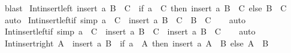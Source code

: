 \begin{isabellebody}
%
\isatagproof
{}\isamarkupfalse%
\ blast%
\endisatagproof
{\isafoldproof}%
%
\isadelimproof
\isanewline
%
\endisadelimproof
\isanewline
{}\isamarkupfalse%
\ Int{\isacharunderscore}{\kern0pt}insert{\isacharunderscore}{\kern0pt}left{\isacharcolon}{\kern0pt}\ {\isachardoublequoteopen}{\isacharparenleft}{\kern0pt}insert\ a\ B{\isacharparenright}{\kern0pt}\ {\isasyminter}\ C\ {\isacharequal}{\kern0pt}\ {\isacharparenleft}{\kern0pt}if\ a\ {\isasymin}\ C\ then\ insert\ a\ {\isacharparenleft}{\kern0pt}B\ {\isasyminter}\ C{\isacharparenright}{\kern0pt}\ else\ B\ {\isasyminter}\ C{\isacharparenright}{\kern0pt}{\isachardoublequoteclose}\isanewline
%
\isadelimproof
\ \ %
\endisadelimproof
%
\isatagproof
{}\isamarkupfalse%
\ auto%
\endisatagproof
{\isafoldproof}%
%
\isadelimproof
\isanewline
%
\endisadelimproof
\isanewline
{}\isamarkupfalse%
\ Int{\isacharunderscore}{\kern0pt}insert{\isacharunderscore}{\kern0pt}left{\isacharunderscore}{\kern0pt}if{}\ {\isacharbrackleft}{\kern0pt}simp{\isacharbrackright}{\kern0pt}{\isacharcolon}{\kern0pt}\ {\isachardoublequoteopen}a\ {\isasymnotin}\ C\ {\isasymLongrightarrow}\ {\isacharparenleft}{\kern0pt}insert\ a\ B{\isacharparenright}{\kern0pt}\ {\isasyminter}\ C\ {\isacharequal}{\kern0pt}\ B\ {\isasyminter}\ C{\isachardoublequoteclose}\isanewline
%
\isadelimproof
\ \ %
\endisadelimproof
%
\isatagproof
{}\isamarkupfalse%
\ auto%
\endisatagproof
{\isafoldproof}%
%
\isadelimproof
\isanewline
%
\endisadelimproof
\isanewline
{}\isamarkupfalse%
\ Int{\isacharunderscore}{\kern0pt}insert{\isacharunderscore}{\kern0pt}left{\isacharunderscore}{\kern0pt}if{}\ {\isacharbrackleft}{\kern0pt}simp{\isacharbrackright}{\kern0pt}{\isacharcolon}{\kern0pt}\ {\isachardoublequoteopen}a\ {\isasymin}\ C\ {\isasymLongrightarrow}\ {\isacharparenleft}{\kern0pt}insert\ a\ B{\isacharparenright}{\kern0pt}\ {\isasyminter}\ C\ {\isacharequal}{\kern0pt}\ insert\ a\ {\isacharparenleft}{\kern0pt}B\ {\isasyminter}\ C{\isacharparenright}{\kern0pt}{\isachardoublequoteclose}\isanewline
%
\isadelimproof
\ \ %
\endisadelimproof
%
\isatagproof
{}\isamarkupfalse%
\ auto%
\endisatagproof
{\isafoldproof}%
%
\isadelimproof
\isanewline
%
\endisadelimproof
\isanewline
{}\isamarkupfalse%
\ Int{\isacharunderscore}{\kern0pt}insert{\isacharunderscore}{\kern0pt}right{\isacharcolon}{\kern0pt}\ {\isachardoublequoteopen}A\ {\isasyminter}\ {\isacharparenleft}{\kern0pt}insert\ a\ B{\isacharparenright}{\kern0pt}\ {\isacharequal}{\kern0pt}\ {\isacharparenleft}{\kern0pt}if\ a\ {\isasymin}\ A\ then\ insert\ a\ {\isacharparenleft}{\kern0pt}A\ {\isasyminter}\ B{\isacharparenright}{\kern0pt}\ else\ A\ {\isasyminter}\ B{\isacharparenright}{\kern0pt}{\isachardoublequoteclose}\isanewline

\end{isabellebody}

